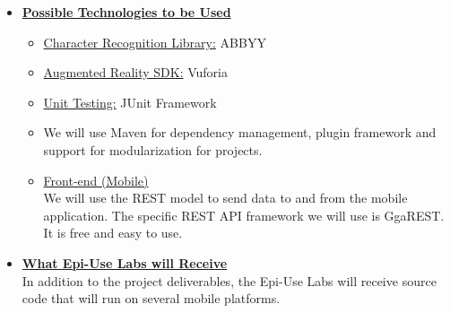 \documentclass[a4paper,12pt]{article}
\begin{document}
\begin{itemize}
\item {\large \underline{\textbf{Possible Technologies to be Used}}}\\[0.2cm]
\begin{itemize}
	\item \underline{Character Recognition Library:} ABBYY
	\\
	\item \underline{Augmented Reality SDK:} Vuforia
	\\
	\item \underline{Unit Testing:}   JUnit Framework
	\\
	\item We will use Maven for dependency management, plugin framework and support for modularization for 				projects.
	\\
	\item \underline{Front-end (Mobile)}
	\\[0.2cm]
	We will use the REST model to send data to and from the mobile application.  The specific REST API framework we 			will use is GgaREST. It is free and easy to use.
\end{itemize}


 \item {\large \underline{\textbf{What Epi-Use Labs will Receive}}}\\[0.2cm]
In addition to the project deliverables, the Epi-Use Labs will receive source code that will run on several mobile platforms.
\end{itemize}
\end{document}
